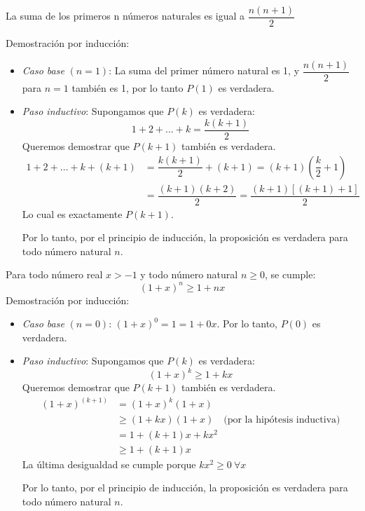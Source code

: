 \begin{fmd-example}
	La suma de los primeros n números naturales es igual a \( \dfrac{n(n+1)}{2} \)
	
	Demostración por inducción:
	
	\begin{itemize}
		\item \textit{Caso base} $(n=1)$: La suma del primer número natural es 1, y \( \dfrac{n(n+1)}{2} \) para $n = 1$ también es 1, por lo tanto $P(1)$ es verdadera.
		
		\item \textit{Paso inductivo}: Supongamos que $P(k)$ es verdadera:
		\[ 1 + 2 + \dots + k = \dfrac{k(k+1)}{2} \]
		Queremos demostrar que $P(k+1)$ también es verdadera.
		\[ \begin{split}
			1 + 2 + \dots + k + (k+1) &= \dfrac{k(k+1)}{2}  + (k+1) = (k+1) \left(\dfrac{k}{2} + 1\right) \\ &= \dfrac{(k+1)(k+2)}{2} = \dfrac{(k+1)\left[ (k+1) + 1 \right]}{2}
		\end{split} \]
		Lo cual es exactamente $P(k+1)$.
		
		Por lo tanto, por el principio de inducción, la proposición es verdadera para todo número natural $n$.
	\end{itemize}
\end{fmd-example}

\begin{fmd-example}
	Para todo número real $x > -1$ y todo número natural $n \geq 0$, se cumple:
	\[ (1+x)^n \geq 1 + nx  \]
	Demostración por inducción:
	
	\begin{itemize}
		\item \textit{Caso base} $(n=0)$: $(1+x)^0 = 1 = 1 + 0x$. Por lo tanto, $P(0)$ es verdadera.
		
		\item \textit{Paso inductivo}: Supongamos que $P(k)$ es verdadera:
		\[ (1+x)^k \geq 1 + kx \]
		Queremos demostrar que $P(k+1)$ también es verdadera.
		\[ \begin{split}
			(1 + x)^{(k+1)} &= (1 + x)^k (1 + x) \\
			& \geq (1+kx)(1+x) \quad \text{(por la hipótesis inductiva)} \\
			& = 1 + (k+1)x + kx^2 \\
			& \geq 1 + (k+1)x
		\end{split} \]
		La última desigualdad se cumple porque $kx^2 \geq 0 \ \forall x$
		
		Por lo tanto, por el principio de inducción, la proposición es verdadera para todo número natural $n$.
	\end{itemize}
\end{fmd-example}



